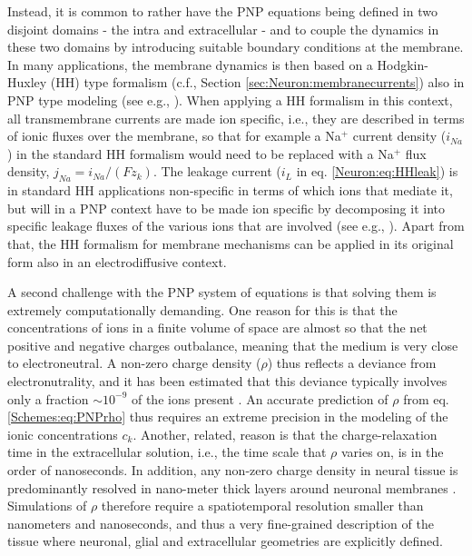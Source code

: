 Instead, it is common to rather have the PNP equations being defined in two disjoint domains - the intra and extracellular - and to couple the dynamics in these two domains by introducing suitable boundary conditions at the membrane. In many applications, the membrane dynamics is then based on a Hodgkin-Huxley (HH) type formalism (c.f., Section \ref{sec:Neuron:membranecurrents}) also in PNP type modeling (see e.g., \cite{Lopreore2008, Pods2013, Gardner2015, Pods2017}). When applying a HH formalism in this context, all transmembrane currents are made ion specific, i.e., they are described in terms of ionic fluxes over the membrane, so that for example a Na$^+$ current density ($i_{Na}$) in the standard HH formalism would need to be replaced with a Na$^+$ flux density, $j_{Na} = i_{Na}/(Fz_k)$. The leakage current ($i_L$ in eq. \ref{Neuron:eq:HHleak}) is in standard HH applications non-specific in terms of which ions that mediate it, but will in a PNP context have to be made ion specific by decomposing it into specific leakage fluxes of the various ions that are involved (see e.g., \cite{Pods2013}). Apart from that, the HH formalism for membrane mechanisms can be applied in its original form also in an electrodiffusive context.

A second challenge with the PNP system of equations is that solving them is extremely computationally demanding. One reason for this is that the concentrations of ions in a finite volume of space are almost so that the net positive and negative charges outbalance, meaning that the medium is very close to electroneutral. A non-zero charge density ($\rho$) thus reflects a deviance from electronutrality, and it has been estimated that this deviance typically involves only a fraction $\sim 10^{-9}$ of the ions present \cite{Aguilella1987}. An accurate prediction of $\rho$ from eq. \ref{Schemes:eq:PNPrho} thus requires an extreme precision in the modeling of the ionic concentrations $c_k$. Another, related, reason is that the charge-relaxation time in the extracellular solution, i.e., the time scale that $\rho$ varies on, is in the order of nanoseconds. In addition, any non-zero charge density in neural tissue is predominantly resolved in nano-meter thick layers around neuronal membranes \cite{Grodzinsky2011, Gratiy2017}. Simulations of $\rho$ therefore require a spatiotemporal resolution smaller than nanometers and nanoseconds, and thus a very fine-grained description of the tissue where neuronal, glial and extracellular geometries are explicitly defined.

